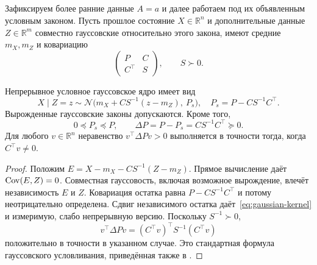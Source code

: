 \subsection{}
{Зафиксируем более ранние данные $A=a$ и далее работаем под их объявленным условным законом. Пусть прошлое состояние $X\in\mathbb R^n$ и дополнительные данные $Z\in\mathbb R^m$ совместно гауссовские относительно этого закона, имеют средние $m_X,m_Z$ и ковариацию}
\[
\begin{pmatrix}P&C\\C^\top&S\end{pmatrix},\qquad S\succ0.
\]
\begin{theorem}
\label{thm:gaussian-contraction}
{Непрерывное условное гауссовское ядро имеет вид}
\begin{equation}\label{eq:gaussian-kernel}
X\mid Z=z\sim\mathcal N\bigl(m_X+CS^{-1}(z-m_Z),\ P_s\bigr),
\quad P_s=P-CS^{-1}C^\top.
\end{equation}
{Вырожденные гауссовские законы допускаются. Кроме того,}
\begin{equation}\label{eq:cov-gain}
0\preceq P_s\preceq P,\qquad
\Delta P=P-P_s=CS^{-1}C^\top\succeq0.
\end{equation}
{Для любого $v\in\mathbb R^n$ неравенство $v^\top\Delta Pv>0$ выполняется в точности тогда, когда $C^\top v\ne0$.}
\end{theorem}
\begin{proof}
{Положим $E=X-m_X-CS^{-1}(Z-m_Z)$. Прямое вычисление даёт $\operatorname{Cov}(E,Z)=0$. Совместная гауссовость, включая возможное вырождение, влечёт независимость $E$ и $Z$. Ковариация остатка равна $P-CS^{-1}C^\top$ и потому неотрицательно определена. Сдвиг независимого остатка даёт~\eqref{eq:gaussian-kernel} и измеримую, слабо непрерывную версию. Поскольку $S^{-1}\succ0$,}
\[
v^\top\Delta Pv=(C^\top v)^\top S^{-1}(C^\top v)
\]
{положительно в точности в указанном случае. Это стандартная формула гауссовского условливания, приведённая также в \cite[Appendix A.1, Lemma A.3]{SarkkaSvensson2023}.}
\end{proof}

